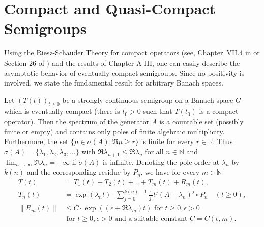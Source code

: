 \section{Compact and Quasi-Compact Semigroups}
\hspace{1cm}{\Large by Günther Greiner}
\vspace{.5cm}
\newline
Using the Riesz-Schauder Theory for compact operators (see, \eg
Chapter~VII.4 in \citet{dunfordschwartz:1958} or Section 26 of \citet{pietsch:1978}) and the results of Chapter A-III, one can easily describe the
asymptotic behavior of eventually compact semigroups.
Since no positivity is involved, we state the fundamental result for arbitrary Banach
spaces.

\begin{theorem}\label{thm:b4-2.1}
Let $(T(t))_{t \geq 0}$ be a strongly continuous semigroup on a Banach space $G$ which is eventually compact (\ie  there is $t_{0} > 0$ such that $T(t_{0})$ is a compact operator).
Then the spectrum of the generator $A$ is a countable set (possibly finite or empty) and contains only poles of finite algebraic multiplicity.
Furthermore, the set $\{\mu \in \sigma(A) \colon \Re \mu \geq r\}$ is finite for every $r \in \mathbb{R}$.
Thus
	$\sigma(A) = \{\lambda_1,\lambda_2,\lambda_3, \ldots \}$ with $\Re \lambda_{n+1} \leq \Re \lambda_n$ for all $n \in \mathbb{N}$ and
	$\lim_{n \to \infty} \Re \lambda_n = -\infty$ if $\sigma(A)$ is infinite.
	Denoting the pole order at $\lambda_n$ by $k(n)$ and the corresponding residue
	by $P_n$, we have for every $m \in \mathbb{N}$
\begin{equation}\label{eq:b4-2.1}
\begin{aligned}
	T(t) &= T_1(t) + T_2(t) + .. + T_m(t) + R_m(t) ,\\
	T_n(t) &= \exp(\lambda_n t) \cdot \sum_{j=0}^{k(n)-1} \frac{1}{j!}t^j(A - \lambda_n)^j \circ P_n 
		\quad (t \geq 0) ,\\
	\|R_m(t)\| & \leq C \cdot \exp((\epsilon +\Re  \lambda_m)t) \text{ for }  t \geq 0, \epsilon >0\\
			&  \text{ for }  t \geq 0, \epsilon >0  \text{ and a suitable	constant } C=C(\epsilon ,m) .
		\end{aligned}
	\end{equation}
\end{theorem}
